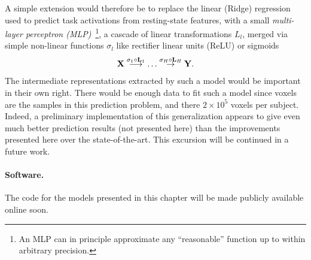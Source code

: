 A simple extension would therefore be to replace the linear (Ridge) regression used to predict task activations from resting-state features, with a small \textit{multi-layer perceptron (MLP)}~\footnote{An MLP can in principle approximate any ``reasonable'' function up to within arbitrary precision.}, a cascade of linear transformations $L_l$, merged via simple non-linear functions $\sigma_l$ like rectifier linear units (ReLU) or sigmoids
$$\mathbf{X} \overset{\sigma_1 \circ \mathbf{L}_1}{\longrightarrow} \ldots \overset{\sigma_H \circ \mathbf{L}_H}{\rightarrow}\mathbf{Y}.
$$
The intermediate representations extracted by such a model would be important in their own right.
There would be enough data to fit such a model since voxels are the samples in this prediction problem, and there $2 \times 10^5$ voxels per subject.
Indeed, a preliminary implementation of this generalization appears to give even much better prediction results (not presented here) than the improvements presented here over the state-of-the-art. This excursion will be continued in a future work.

\paragraph{Software.} The code for the models presented in this chapter will be made publicly available online soon.




